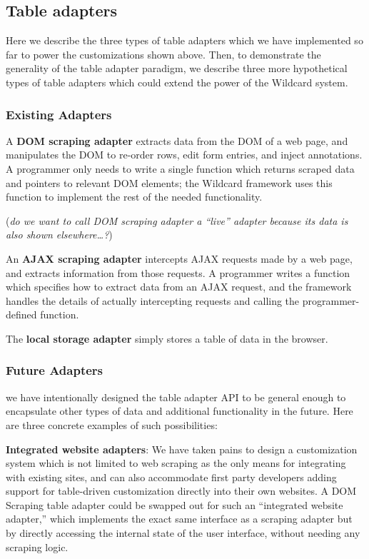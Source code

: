 \documentclass[sigplan,10pt,anonymous,review]{acmart}
\begin{document}
\hypertarget{table-adapters}{%
\subsection{Table adapters}\label{table-adapters}}

Here we describe the three types of table adapters which we have
implemented so far to power the customizations shown above. Then, to
demonstrate the generality of the table adapter paradigm, we describe
three more hypothetical types of table adapters which could extend the
power of the Wildcard system.

\hypertarget{existing-adapters}{%
\subsubsection{Existing Adapters}\label{existing-adapters}}

A \textbf{DOM scraping adapter} extracts data from the DOM of a web
page, and manipulates the DOM to re-order rows, edit form entries, and
inject annotations. A programmer only needs to write a single function
which returns scraped data and pointers to relevant DOM elements; the
Wildcard framework uses this function to implement the rest of the
needed functionality.

(\emph{do we want to call DOM scraping adapter a ``live'' adapter
because its data is also shown elsewhere\ldots?})

An \textbf{AJAX scraping adapter} intercepts AJAX requests made by a web
page, and extracts information from those requests. A programmer writes
a function which specifies how to extract data from an AJAX request, and
the framework handles the details of actually intercepting requests and
calling the programmer-defined function.

The \textbf{local storage adapter} simply stores a table of data in the
browser.

\hypertarget{future-adapters}{%
\subsubsection{Future Adapters}\label{future-adapters}}

we have intentionally designed the table adapter API to be general
enough to encapsulate other types of data and additional functionality
in the future. Here are three concrete examples of such possibilities:

\textbf{Integrated website adapters}: We have taken pains to design a
customization system which is not limited to web scraping as the only
means for integrating with existing sites, and can also accommodate
first party developers adding support for table-driven customization
directly into their own websites. A DOM Scraping table adapter could be
swapped out for such an ``integrated website adapter,'' which implements
the exact same interface as a scraping adapter but by directly accessing
the internal state of the user interface, without needing any scraping
logic.
\end{document}
